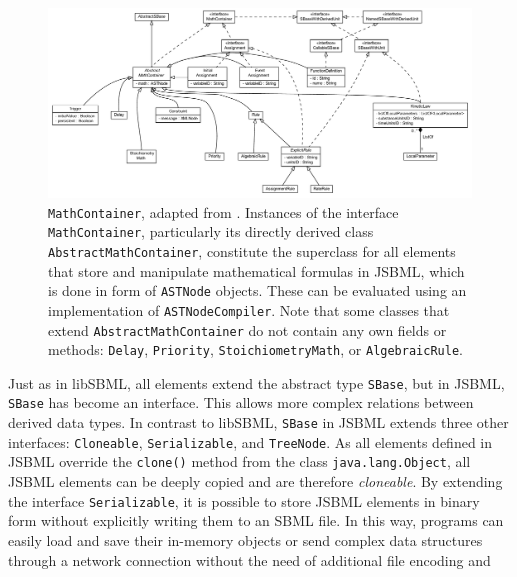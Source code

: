 \documentclass[
  BCOR12mm,
  letterpaper,
  11pt,
  headsepline,
  pointlessnumbers,
  tablecaptionabove,
  onelinecaption,
  headinclude,
  appendixprefix,
  idxtotoc,
  bibtotoc,
  twoside,
  titlepage
]{scrartcl}
\begin{document}
\begin{figure}[htb]
 \centering
 \includegraphics[width=\textwidth]{img/MathContainer}
 \caption[\texttt{MathContainer}]{\texttt{MathContainer}, adapted from
 \citep{Draeger2011}. Instances of the interface \texttt{MathContainer},
 particularly its directly derived class \texttt{AbstractMathContainer},
 constitute the superclass for all elements that store and manipulate
 mathematical formulas in JSBML, which is done in form of \texttt{ASTNode}
 objects. These can be evaluated using an implementation of
 \texttt{ASTNodeCompiler}. Note that some classes that extend
 \texttt{AbstractMathContainer} do not contain any own fields or methods:
 \texttt{Delay}, \texttt{Priority}, \texttt{StoichiometryMath}, or
 \texttt{AlgebraicRule}.}
 \label{fig:MathContainerHierarchy}
\end{figure}
Just as in libSBML, all elements extend the abstract type \texttt{SBase},
 but in JSBML, \texttt{SBase}
has become an interface. This allows more complex relations
between derived data types. In contrast to libSBML, \texttt{SBase} in JSBML
extends three other interfaces: \texttt{Cloneable}, \texttt{Serializable},
 and \texttt{TreeNode}. As all
elements defined in JSBML override the \texttt{clone()}
method from the class \texttt{java.lang.Object},
all JSBML elements can be deeply copied and are therefore \emph{cloneable}. By
extending the interface
\texttt{Serializable}, it is possible
to store JSBML elements in
binary form without explicitly writing them to an SBML file. 
In this way, programs can easily load and save their in-memory objects or send complex data structures
through a network connection without the need of additional file encoding and
\end{document}
